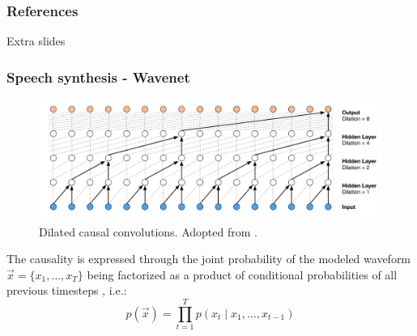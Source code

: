 \documentclass[a4paper,9pt]{beamer}
\theoremstyle{mytheoremstyle}
\begin{document}
\begin{frame}[allowframebreaks]
\frametitle{References}
\printbibliography
\end{frame}






















\begin{frame}
\end{frame}


\begin{frame}
\begin{center}
Extra slides
\end{center}
\end{frame}

\begin{frame}
\frametitle{Speech synthesis - Wavenet}
\begin{figure}
\begin{center}
  \includegraphics[width=\textwidth]{res/dilated_convolutions.png}
\end{center}
	\caption{Dilated causal convolutions. Adopted from \parencite{vandenoord2016a}.}
\end{figure}
The causality is expressed through the joint probability of the modeled waveform 
$\vec{x} = \{ x_1, \dots, x_T \}$
being factorized as a product of conditional probabilities of all previous timesteps \parencite{vandenoord2016a}, i.e.:
\begin{equation}
p\left(\vec{x}\right) = \prod_{t=1}^{T} p\left(x_t \mid x_1, \dots ,x_{t-1}\right)
\end{equation}
\end{frame}
\end{document}
